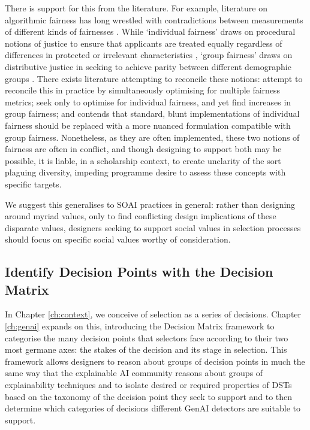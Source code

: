 There is support for this from the literature. For example, literature on algorithmic fairness has long wrestled with contradictions between measurements of different kinds of fairnesses \cite{pmlr-v80-kearns18a}. While `individual fairness' draws on procedural notions of justice to ensure that applicants are treated equally regardless of differences in protected or irrelevant characteristics \cite{dwork_fairness_2012}, `group fairness' draws on distributive justice in seeking to achieve parity between different demographic groups \cite{Citron_2008,Olsaretti_2018}. There exists literature attempting to reconcile these notions: \textcite{pmlr-v28-zemel13} attempt to reconcile this in practice by simultaneously optimising for multiple fairness metrics; \textcite{lahoti2019ifairlearningindividuallyfair} seek only to optimise for individual fairness, and yet find increases in group fairness; and \textcite{binns_apparent_2019} contends that standard, blunt implementations of individual fairness should be replaced with a more nuanced formulation compatible with group fairness. Nonetheless, as they are often implemented, these two notions of fairness are often in conflict, and though designing to support both may be possible, it is liable, in a scholarship context, to create unclarity of the sort plaguing diversity, impeding programme desire to assess these concepts with specific targets. 

We suggest this generalises to SOAI practices in general: rather than designing around myriad values, only to find conflicting design implications of these disparate values, designers seeking to support social values in selection processes should focus on specific social values worthy of consideration.

\subsection{Identify Decision Points with the Decision Matrix}
In Chapter \ref{ch:context}, we conceive of selection as a series of decisions. Chapter \ref{ch:genai} expands on this, introducing the Decision Matrix framework to categorise the many decision points that selectors face according to their two most germane axes: the stakes of the decision and its stage in selection. This framework allows designers to reason about groups of decision points in much the same way that the explainable AI community reasons about groups of explainability techniques and to isolate desired or required properties of DSTs based on the taxonomy of the decision point they seek to support and to then determine which categories of decisions different GenAI detectors are suitable to support\cite{ford_play_2020,kumar_problems_2020,doshi-velez_towards_2017,friedrich_taxonomy_2011,molnar_interpretable_2019}. 

